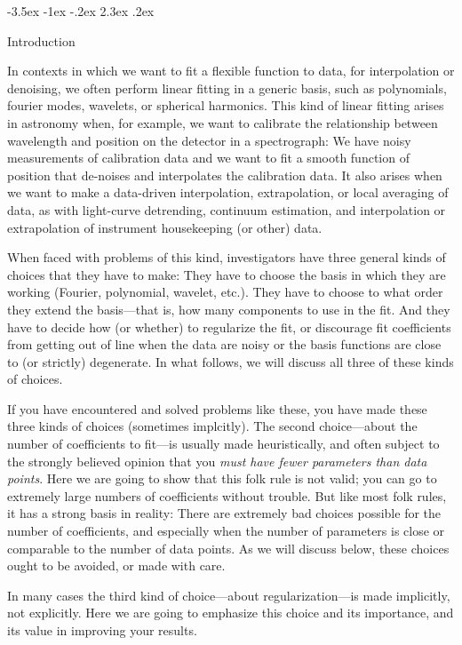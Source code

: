 \documentclass[12pt,letterpaper]{article}
\makeatletter
\renewcommand\section{\@startsection {section}{1}{\z@}%
  {-3.5ex \@plus -1ex \@minus -.2ex}%
  {2.3ex \@plus.2ex}%
  {\raggedright\normalfont\Large\bfseries}}
\makeatother
\begin{document}
\section{Introduction}

In contexts in which we want to fit a flexible function to data, for interpolation or denoising, we often perform linear fitting in a generic basis, such as polynomials, fourier modes, wavelets, or spherical harmonics.
This kind of linear fitting arises in astronomy when, for example, we want to calibrate the relationship between wavelength and position on the detector in a spectrograph:
We have noisy measurements of calibration data and we want to fit a smooth function of position that de-noises and interpolates the calibration data.
It also arises when we want to make a data-driven interpolation, extrapolation, or local averaging of data, as with light-curve detrending, continuum estimation, and interpolation or extrapolation of instrument housekeeping (or other) data.

When faced with problems of this kind, investigators have three general kinds of choices that they have to make:
They have to choose the basis in which they are working (Fourier, polynomial, wavelet, etc.).
They have to choose to what order they extend the basis---that is, how many components to use in the fit.
And they have to decide how (or whether) to regularize the fit, or discourage fit coefficients from getting out of line when the data are noisy or the basis functions are close to (or strictly) degenerate.
In what follows, we will discuss all three of these kinds of choices.

If you have encountered and solved problems like these, you have made these three kinds of choices (sometimes implcitly).
The second choice---about the number of coefficients to fit---is usually made heuristically, and often subject to the strongly believed opinion that you \emph{must have fewer parameters than data points}.
Here we are going to show that this folk rule is not valid; you can go to extremely large numbers of coefficients without trouble.
But like most folk rules, it has a strong basis in reality: There are extremely bad choices possible for the number of coefficients, and especially when the number of parameters is close or comparable to the number of data points.
As we will discuss below, these choices ought to be avoided, or made with care.

In many cases the third kind of choice---about regularization---is made implicitly, not explicitly.
Here we are going to emphasize this choice and its importance, and its value in improving your results.
\end{document}
